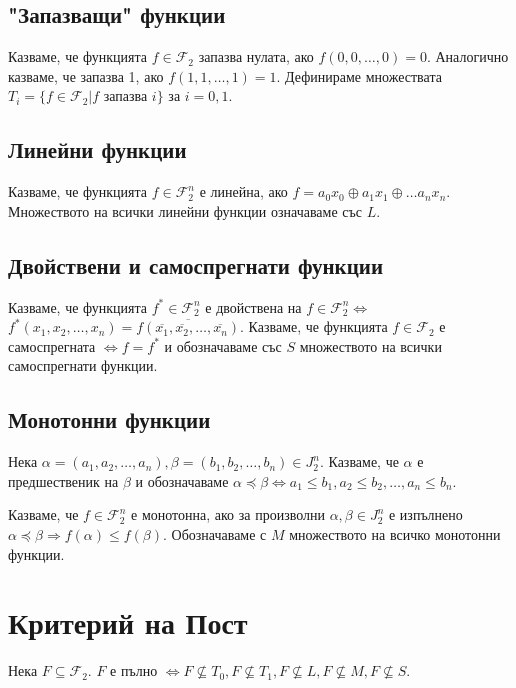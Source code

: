 \documentclass[fleqn,12pt]{article}
\begin{document}
\begin{flushleft}
\subsection{"Запазващи" функции}
Казваме, че функцията $f \in \mathcal{F}_2$ запазва нулата, ако $f(0, 0, \dots, 0) = 0$.
Аналогично казваме, че запазва 1, ако $f(1, 1, \dots, 1) = 1$.
Дефинираме множествата $T_i = \{f \in \mathcal{F}_2 | f \text{ запазва } i\}$ за $i=0,1$.

\subsection{Линейни функции}
Казваме, че функцията $f \in \mathcal{F}_2^n$ е линейна, ако $f = a_0 x_0 \oplus a_1 x_1 \oplus \dots a_n x_n$.
Множеството на всички линейни функции означаваме със $L$.

\subsection{Двойствени и самоспрегнати функции}
Казваме, че функцията $f^* \in \mathcal{F}_2^n$ е двойствена на $f \in \mathcal{F}_2^n \Leftrightarrow$
$f^*(x_1, x_2, \dots, x_n) = \overline{f(\overline{x_1}, \overline{x_2}, \dots, \overline{x_n})}$.
Казваме, че функцията $f \in \mathcal{F}_2$ е самоспрегната $\Leftrightarrow f = f^*$ и обозначаваме със $S$ множеството
на всички самоспрегнати функции.

\subsection{Монотонни функции}
Нека $\alpha = (a_1, a_2, \dots, a_n), \beta = (b_1, b_2, \dots, b_n) \in J_2^n$. Казваме, че
$\alpha$ е предшественик на $\beta$ и обозначаваме $\alpha \preceq \beta \Leftrightarrow a_1 \leq b_1, a_2 \leq b_2, \dots, a_n \leq b_n$.

Казваме, че $f \in \mathcal{F}_2^n$ е монотонна, ако за произволни $\alpha, \beta \in J_2^n$ е изпълнено
$\alpha \preceq \beta \Rightarrow f(\alpha) \leq f(\beta)$. Обозначаваме с $M$ множеството на всичко монотонни функции.

\section{Критерий на Пост}
Нека $F \subseteq \mathcal{F}_2$. $F$ е пълно $\Leftrightarrow F \nsubseteq T_0, F \nsubseteq T_1, F \nsubseteq L, F \nsubseteq M, F \nsubseteq S$.    

\end{flushleft}
\end{document}
